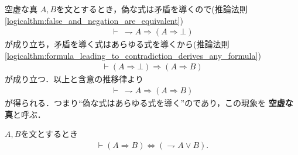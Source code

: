 	\begin{itembox}[l]{空虚な真}
		$A,B$を文とするとき，偽な式は矛盾を導くので(推論法則\ref{logicalthm:false_and_negation_are_equivalent})
		\begin{align}
			\vdash\ \rightharpoondown A \Longrightarrow (A \Longrightarrow \bot)
		\end{align}
		が成り立ち，矛盾を導く式はあらゆる式を導くから(推論法則\ref{logicalthm:formula_leading_to_contradiction_derives_any_formula})
		\begin{align}
			\vdash (A \Longrightarrow \bot) \Longrightarrow (A \Longrightarrow B)
		\end{align}
		が成り立つ．以上と含意の推移律より
		\begin{align}
			\vdash\ \rightharpoondown A \Longrightarrow (A \Longrightarrow B)
		\end{align}
		が得られる．つまり``偽な式はあらゆる式を導く''のであり，この現象を
		{\bf 空虚な真}と呼ぶ．
	\end{itembox}
	
	\begin{screen}
		\begin{logicalthm}[含意は否定と論理和で表せる]\label{logicalthm:rule_of_inference_3}
			$A,B$を文とするとき
			\begin{align}
				\vdash (A \Longrightarrow B) \Longleftrightarrow (\rightharpoondown A \vee B).
			\end{align}
		\end{logicalthm}
	\end{screen}
	
